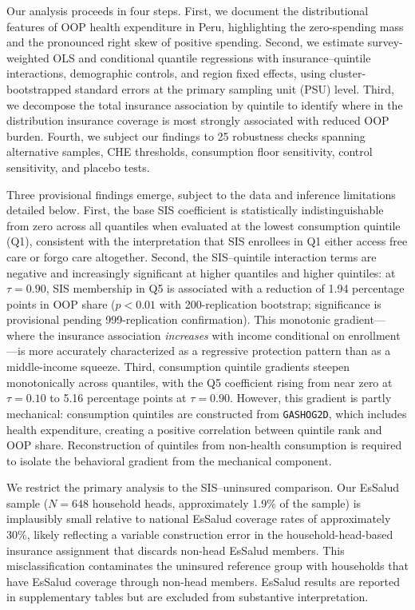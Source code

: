 Our analysis proceeds in four steps. First, we document the distributional features of OOP health expenditure in Peru, highlighting the zero-spending mass and the pronounced right skew of positive spending. Second, we estimate survey-weighted OLS and conditional quantile regressions with insurance--quintile interactions, demographic controls, and region fixed effects, using cluster-bootstrapped standard errors at the primary sampling unit (PSU) level. Third, we decompose the total insurance association by quintile to identify where in the distribution insurance coverage is most strongly associated with reduced OOP burden. Fourth, we subject our findings to 25 robustness checks spanning alternative samples, CHE thresholds, consumption floor sensitivity, control sensitivity, and placebo tests.

Three provisional findings emerge, subject to the data and inference limitations detailed below. First, the base SIS coefficient is statistically indistinguishable from zero across all quantiles when evaluated at the lowest consumption quintile (Q1), consistent with the interpretation that SIS enrollees in Q1 either access free care or forgo care altogether. Second, the SIS--quintile interaction terms are negative and increasingly significant at higher quantiles and higher quintiles: at $\tau = 0.90$, SIS membership in Q5 is associated with a reduction of 1.94 percentage points in OOP share ($p < 0.01$ with 200-replication bootstrap; significance is provisional pending 999-replication confirmation). This monotonic gradient---where the insurance association \textit{increases} with income conditional on enrollment---is more accurately characterized as a regressive protection pattern than as a middle-income squeeze. Third, consumption quintile gradients steepen monotonically across quantiles, with the Q5 coefficient rising from near zero at $\tau = 0.10$ to 5.16 percentage points at $\tau = 0.90$. However, this gradient is partly mechanical: consumption quintiles are constructed from \texttt{GASHOG2D}, which includes health expenditure, creating a positive correlation between quintile rank and OOP share. Reconstruction of quintiles from non-health consumption is required to isolate the behavioral gradient from the mechanical component.

We restrict the primary analysis to the SIS--uninsured comparison. Our EsSalud sample ($N = 648$ household heads, approximately 1.9\% of the sample) is implausibly small relative to national EsSalud coverage rates of approximately 30\%, likely reflecting a variable construction error in the household-head-based insurance assignment that discards non-head EsSalud members. This misclassification contaminates the uninsured reference group with households that have EsSalud coverage through non-head members. EsSalud results are reported in supplementary tables but are excluded from substantive interpretation.

